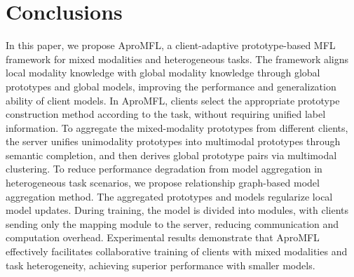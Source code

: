 \section{Conclusions}
In this paper, we propose AproMFL, a client-adaptive prototype-based MFL framework for mixed modalities and heterogeneous tasks. The framework aligns local modality knowledge with global modality knowledge through global prototypes and global models, improving the performance and generalization ability of client models.
In AproMFL, clients select the appropriate prototype construction method according to the task, without requiring unified label information. To aggregate the mixed-modality prototypes from different clients, the server unifies unimodality prototypes into multimodal prototypes through semantic completion, and then derives global prototype pairs via multimodal clustering. To reduce performance degradation from model aggregation in heterogeneous task scenarios, we propose relationship graph-based model aggregation method. 
The aggregated prototypes and models regularize local model updates. During training, the model is divided into modules, with clients sending only the mapping module to the server, reducing communication and computation overhead. Experimental results demonstrate that AproMFL effectively facilitates collaborative training of clients with mixed modalities and task heterogeneity, achieving superior performance with smaller models.